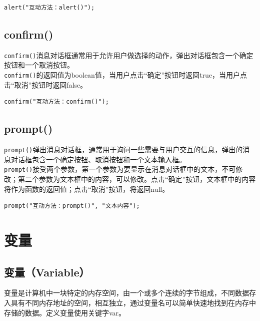 \begin{lstlisting}[style=htmlcssjs]
alert("互动方法：alert()");
\end{lstlisting}

\subsection{confirm()}

\lstinline|confirm()|消息对话框通常用于允许用户做选择的动作，弹出对话框包含一个确定按钮和一个取消按钮。 \\

\lstinline|confirm()|的返回值为boolean值，当用户点击“确定”按钮时返回true，当用户点击“取消”按钮时返回false。 \\

\begin{lstlisting}[style=htmlcssjs]
confirm("互动方法：confirm()");
\end{lstlisting}

\subsection{prompt()}

\lstinline|prompt()|弹出消息对话框，通常用于询问一些需要与用户交互的信息，弹出的消息对话框包含一个确定按钮、取消按钮和一个文本输入框。 \\

\lstinline|prompt()|接受两个参数，第一个参数为要显示在消息对话框中的文本，不可修改；第二个参数为文本框中的内容，可以修改。点击“确定”按钮，文本框中的内容将作为函数的返回值；点击“取消”按钮，将返回null。 \\

\begin{lstlisting}[style=htmlcssjs]
prompt("互动方法：prompt()", "文本内容");
\end{lstlisting}

\newpage

\section{变量}

\subsection{变量（Variable）}

变量是计算机中一块特定的内存空间，由一个或多个连续的字节组成，不同数据存入具有不同内存地址的空间，相互独立，通过变量名可以简单快速地找到在内存中存储的数据。定义变量使用关键字var。 \\

